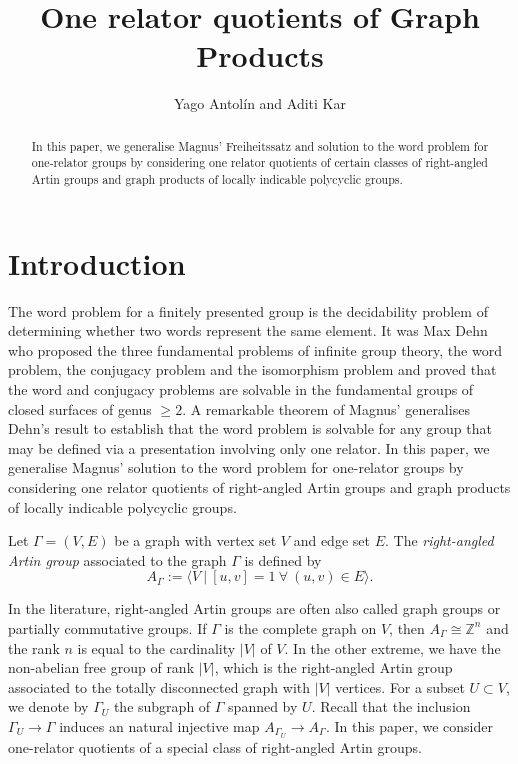 \documentclass[12pt, a4paper]{amsart}
\title{One relator quotients of Graph Products}
\author{Yago Antol\'{i}n and Aditi Kar}
\theoremstyle{remark}
\theoremstyle{definition}
\begin{document}
\begin{abstract} In this paper, we generalise Magnus' Freiheitssatz and solution to the word problem for one-relator groups by considering one relator quotients of  certain classes of right-angled Artin groups and graph products of locally indicable polycyclic groups.   
\end{abstract} 


\maketitle

\section{Introduction}\label{sec:intro}

The word problem for a finitely presented group is the decidability problem of determining whether two words represent the same element. It was Max Dehn who proposed the three fundamental problems of infinite group theory, the word problem, the conjugacy problem and the isomorphism problem and proved that the word and conjugacy problems are solvable in the fundamental groups of closed surfaces of genus $\geq 2$. A remarkable theorem of Magnus' generalises Dehn's result to establish that the word problem is solvable for any group that may be defined via a presentation involving only one relator. In this paper, we generalise Magnus' solution to the word problem for one-relator groups by considering one relator quotients of right-angled Artin groups and graph products of locally indicable polycyclic groups.   

Let ${\Gamma}=(V,E)$ be a graph with vertex set $V$ and edge set $E$. The \textit{right-angled Artin group} associated to the graph ${\Gamma}$ is defined by $$A_{\Gamma}:= \langle V\  |\  [u,v]=1 \ \forall\  (u,v) \in E \rangle.$$

\noindent In the literature, right-angled Artin groups are often also called graph groups or partially commutative groups. If ${\Gamma}$ is the complete graph on $V$, then $A_{\Gamma} \cong \mathbb{Z}^n$ and the rank $n$ is equal to the cardinality $|V|$ of $V$. In the other extreme, we have the non-abelian free group of rank $|V|$, which is the right-angled Artin group associated to the totally disconnected graph with $|V|$ vertices. For a subset $U\subset V$, we  denote by ${\Gamma}_U$ the subgraph of ${\Gamma}$ spanned by $U$. Recall that the inclusion ${\Gamma}_U\to {\Gamma}$ induces an natural injective map $A_{{\Gamma}_U}\to A_{\Gamma}$. In this paper, we consider one-relator quotients of a special class of right-angled Artin groups. 
\end{document}
